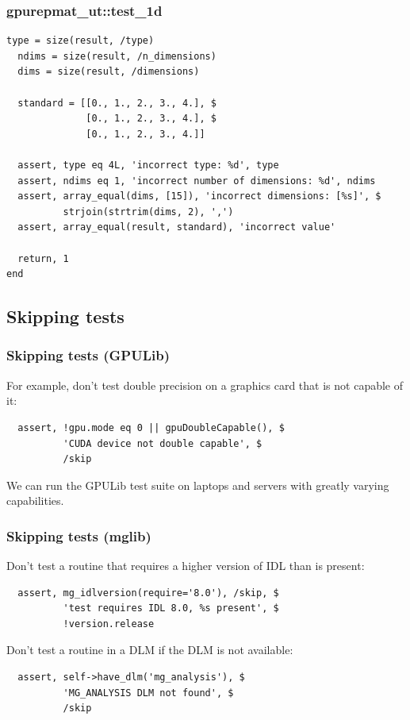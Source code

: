 \documentclass[12pt, handout]{beamer}
\begin{document}
\begin{frame}[t, fragile]
  \frametitle{gpurepmat\_ut::test\_1d}

\begin{lstlisting}[basicstyle=\ttfamily\fontsize{8pt}{8pt}\selectfont]
  type = size(result, /type)
  ndims = size(result, /n_dimensions)
  dims = size(result, /dimensions)

  standard = [[0., 1., 2., 3., 4.], $
              [0., 1., 2., 3., 4.], $
              [0., 1., 2., 3., 4.]]

  assert, type eq 4L, 'incorrect type: %d', type
  assert, ndims eq 1, 'incorrect number of dimensions: %d', ndims
  assert, array_equal(dims, [15]), 'incorrect dimensions: [%s]', $
          strjoin(strtrim(dims, 2), ',')
  assert, array_equal(result, standard), 'incorrect value'

  return, 1
end
\end{lstlisting}
\end{frame}


\subsection{Skipping tests}

\begin{frame}[t, fragile]
  \frametitle{Skipping tests (GPULib)}
For example, don't test double precision on a graphics card that is not capable of it:
\begin{lstlisting}
  assert, !gpu.mode eq 0 || gpuDoubleCapable(), $
          'CUDA device not double capable', $
          /skip
\end{lstlisting}
We can run the GPULib test suite on laptops and servers with greatly varying capabilities.
\end{frame}

\begin{frame}[t, fragile]
  \frametitle{Skipping tests (mglib)}
Don't test a routine that requires a higher version of IDL than is present:
\begin{lstlisting}
  assert, mg_idlversion(require='8.0'), /skip, $
          'test requires IDL 8.0, %s present', $
          !version.release
\end{lstlisting}
Don't test a routine in a DLM if the DLM is not available:
\begin{lstlisting}
  assert, self->have_dlm('mg_analysis'), $
          'MG_ANALYSIS DLM not found', $
          /skip
\end{lstlisting}

\end{frame}
\end{document}
